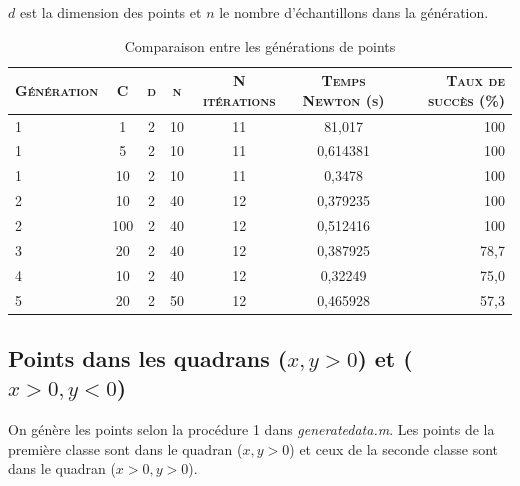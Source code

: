 \documentclass{article}
\begin{document}
$d$ est la dimension des points et $n$ le nombre d'échantillons dans la génération.\\

     \begin{table}[H]
       \caption{Comparaison entre les générations de points}
       \begin{tabular}{|l|c|c|c|c|c|r|}
         \hline
         \textsc{Génération} & \textsc{C} & \textsc{d} & \textsc{n} & \textsc{N itérations} & \textsc{Temps Newton (s)} & \textsc{Taux de succès (\%)}\\
         \hline
         1 & 1 & 2 & 10 & 11 & 81,017 & 100\\
         \hline
         1 & 5 & 2 & 10 & 11 & 0,614381 & 100\\
         \hline
         1 & 10 & 2 & 10 & 11 & 0,3478 & 100\\
         \hline
         2 & 10 & 2 & 40 & 12 & 0,379235 & 100\\
         \hline
         2 & 100 & 2 & 40 & 12 & 0,512416 & 100\\
         \hline
         3 & 20 & 2 & 40 & 12 & 0,387925 & 78,7\\
         \hline
         4 & 10 & 2 & 40 & 12 & 0,32249 & 75,0\\
         \hline
         5 & 20 & 2 & 50 & 12 & 0,465928 & 57,3\\
         \hline
       \end{tabular}
     \end{table}

\subsection{Points dans les quadrans ($x, y > 0$) et ($x > 0, y < 0$)}

On génère les points selon la procédure 1 dans \emph{generatedata.m}. Les points de la première classe sont dans le quadran ($x, y > 0$) et ceux de la seconde classe sont dans le quadran ($x > 0, y > 0$).
\end{document}
